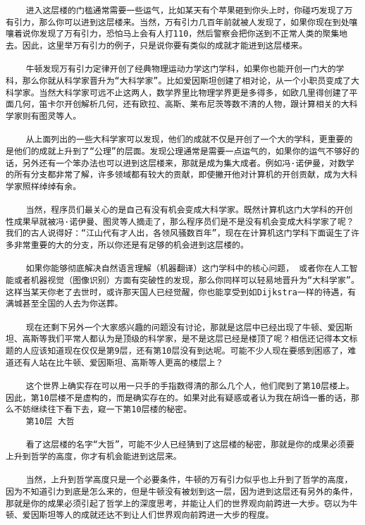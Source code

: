 \begin{verbatim}
    进入这层楼的门槛通常需要一些运气，比如某天有个苹果砸到你头上时，你碰巧发现了万有引力，那么你可以进到这层楼来。当然，万有引力几百年前就被人发现了，如果你现在到处嚷嚷着说你发现了万有引力，恐怕马上会有人打110，然后警察会把你送到不正常人类的聚集地去。因此，这里举万有引力的例子，只是说你要有类似的成就才能进到这层楼来。

    牛顿发现万有引力定律开创了经典物理运动力学这门学科，如果你也能开创一门大的学科，那么你就从科学家晋升为“大科学家”。比如爱因斯坦创建了相对论，从一个小职员变成了大科学家。当然大科学家可远不止这两人，数学界里比物理学界更是多得多，如欧几里得创建了平面几何，笛卡尔开创解析几何，还有欧拉、高斯、莱布尼茨等数不清的人物，跟计算相关的大科学家则有图灵等人。

    从上面列出的一些大科学家可以发现，他们的成就不仅是开创了一个大的学科，更重要的是他们的成就上升到了“公理”的层面。发现公理通常是需要一点运气的，如果你的运气不够好的话，另外还有一个笨办法也可以进到这层楼来，那就是成为集大成者。例如冯·诺伊曼，对数学的所有分支都非常了解，许多领域都有较大的贡献，即使撇开他对计算机的开创贡献，成为大科学家照样绰绰有余。

    当然，程序员们最关心的是自己有没有机会变成大科学家。既然计算机这门大学科的开创性成果早就被冯·诺伊曼、图灵等人摘走了，那么程序员们是不是没有机会变成大科学家了呢？我们的古人说得好：“江山代有才人出，各领风骚数百年”，现在在计算机这门学科下面诞生了许多非常重要的大的分支，所以你还是有足够的机会进到这层楼的。

    如果你能够彻底解决自然语言理解（机器翻译）这门学科中的核心问题， 或者你在人工智能或者机器视觉（图像识别）方面有突破性的发现，那么你同样可以轻易地晋升为“大科学家”。这样当某天你老了去世时，或许那天国人已经觉醒，你也能享受到如Dijkstra一样的待遇，有满城甚至全国的人去为你送葬。

    现在还剩下另外一个大家感兴趣的问题没有讨论，那就是这层中已经出现了牛顿、爱因斯坦、高斯等我们平常人都认为是顶级的科学家，是不是这层已经是楼顶了呢？相信还记得本文标题的人应该知道现在仅仅是第9层，还有第10层没有到达呢。可能不少人现在要感到困惑了，难道还有人站在比牛顿、爱因斯坦、高斯等人更高的楼层上？

    这个世界上确实存在可以用一只手的手指数得清的那么几个人，他们爬到了第10层楼上。因此，第10层楼不是虚构的，而是确实存在的。如果对此有疑惑或者认为我在胡诌一番的话，那么不妨继续往下看下去，窥一下第10层楼的秘密。
    第10层 大哲

    看了这层楼的名字“大哲”，可能不少人已经猜到了这层楼的秘密，那就是你的成果必须要上升到哲学的高度，你才有机会能进到这层来。

    当然，上升到哲学高度只是一个必要条件，牛顿的万有引力似乎也上升到了哲学的高度，因为不知道引力到底是怎么来的，但是牛顿没有被划到这一层，因为进到这层还有另外的条件，那就是你的成果必须引起了哲学上的深度思考，并能让人们的世界观向前跨进一大步。窃以为牛顿、爱因斯坦等人的成就还达不到让人们世界观向前跨进一大步的程度。


\end{verbatim}
